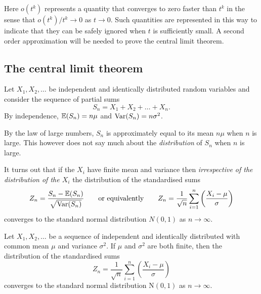 Here $o(t^k)$ represents a quantity that converges to zero faster than $t^k$ in the sense that $o(t^k)/t^k\to 0$ as $t\to 0$. Such quantities are represented in this way to indicate that they can be safely ignored when $t$ is sufficiently small. A second order approximation will be needed to prove the central limit theorem. 

\subsection{The central limit theorem}

Let $X_1,X_2,\ldots$ be independent and identically distributed random variables and consider the sequence of partial sums
\[
S_n = X_1 + X_2 + \ldots + X_n.
\]
By independence, $\mathbb{E}(S_n)=n\mu$ and $\text{Var}(S_n)=n\sigma^2$.

By the law of large numbers, $S_n$ is approximately equal to its mean $n\mu$ when $n$ is large. This however does not say much about the \emph{distribution} of $S_n$ when $n$ is large. 

\bigskip
It turns out that if the $X_i$ have finite mean and variance then \emph{irrespective of the distribution of the $X_i$} the distribution of the standardised sums
\[
Z_n = \frac{S_n-\expe(S_n)}{\sqrt{\var(S_n)}} %
\qquad\text{or equivalently}\qquad
Z_n=\frac{1}{\sqrt{n}}\sum_{i=1}^n\left(\frac{X_i-\mu}{\sigma}\right)
\]
converges to the standard normal distribution $N(0,1)$ as $n\to\infty$.

\begin{theorem}
Let $X_1,X_2,\ldots$ be a sequence of independent and identically distributed with common mean $\mu$ and variance $\sigma^2$. If $\mu$ and $\sigma^2$ are both finite, then the distribution of the standardised sums
\[
Z_n=\frac{1}{\sqrt{n}}\sum_{i=1}^n\left(\frac{X_i-\mu}{\sigma}\right)
\]
converges to the standard normal distribution $\text{N}(0,1)$ as $n\to\infty$.
\end{theorem}

